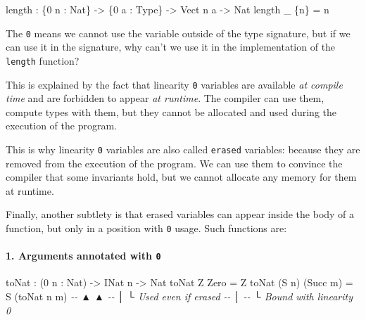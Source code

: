 \documentclass[
]{article}
\newenvironment{Shaded}{}{}
\newcommand{\CommentTok}[1]{\textcolor[rgb]{0.38,0.63,0.69}{\textit{#1}}}
\newcommand{\DataTypeTok}[1]{\textcolor[rgb]{0.56,0.13,0.00}{#1}}
\newcommand{\DecValTok}[1]{\textcolor[rgb]{0.25,0.63,0.44}{#1}}
\newcommand{\FunctionTok}[1]{\textcolor[rgb]{0.02,0.16,0.49}{#1}}
\newcommand{\NormalTok}[1]{#1}
\newcommand{\OperatorTok}[1]{\textcolor[rgb]{0.40,0.40,0.40}{#1}}
\newcommand{\OtherTok}[1]{\textcolor[rgb]{0.00,0.44,0.13}{#1}}
\begin{document}
\begin{Shaded}
\begin{Highlighting}[]
\FunctionTok{length} \OperatorTok{:}\NormalTok{ \{}\DecValTok{0}\NormalTok{ n }\OperatorTok{:} \DataTypeTok{Nat}\NormalTok{\} }\OtherTok{{-}\textgreater{}}\NormalTok{ \{}\DecValTok{0}\NormalTok{ a }\OperatorTok{:} \DataTypeTok{Type}\NormalTok{\} }\OtherTok{{-}\textgreater{}} \DataTypeTok{Vect}\NormalTok{ n a }\OtherTok{{-}\textgreater{}} \DataTypeTok{Nat}
\FunctionTok{length}\NormalTok{ \_ \{n\} }\OtherTok{=}\NormalTok{ n}
\end{Highlighting}
\end{Shaded}

The \texttt{0} means we cannot use the variable outside of the type
signature, but if we can use it in the signature, why can't we use it in
the implementation of the \texttt{length} function?

This is explained by the fact that linearity \texttt{0} variables are
available \emph{at compile time} and are forbidden to appear \emph{at
runtime}. The compiler can use them, compute types with them, but they
cannot be allocated and used during the execution of the program.

This is why linearity \texttt{0} variables are also called
\texttt{erased} variables: because they are removed from the execution
of the program. We can use them to convince the compiler that some
invariants hold, but we cannot allocate any memory for them at runtime.

Finally, another subtlety is that erased variables can appear inside the
body of a function, but only in a position with \texttt{0} usage. Such
functions are:

\hypertarget{arguments-annotated-with-0}{%
\paragraph{\texorpdfstring{1. Arguments annotated with
\texttt{0}}{1. Arguments annotated with 0}}\label{arguments-annotated-with-0}}

\begin{Shaded}
\begin{Highlighting}[]
\NormalTok{toNat }\OperatorTok{:}\NormalTok{ (}\DecValTok{0}\NormalTok{ n }\OperatorTok{:} \DataTypeTok{Nat}\NormalTok{) }\OtherTok{{-}\textgreater{}} \DataTypeTok{INat}\NormalTok{ n }\OtherTok{{-}\textgreater{}} \DataTypeTok{Nat}
\NormalTok{toNat }\DataTypeTok{Z} \DataTypeTok{Zero} \OtherTok{=} \DataTypeTok{Z}
\NormalTok{toNat (}\DataTypeTok{S}\NormalTok{ n) (}\DataTypeTok{Succ}\NormalTok{ m) }\OtherTok{=} \DataTypeTok{S}\NormalTok{ (toNat n m)}
\CommentTok{{-}{-}       ▲                      ▲}
\CommentTok{{-}{-}       │                      └ Used even if erased}
\CommentTok{{-}{-}       │}
\CommentTok{{-}{-}       └ Bound with linearity 0}
\end{Highlighting}
\end{Shaded}
\end{document}
